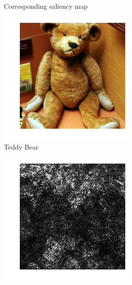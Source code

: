 \documentclass{article}
\begin{document}
\begin{figure}[hbt!]
\begin{subfigure}{.34\textwidth}
    		\caption*{Corresponding saliency map}
    		\label{energydetPSK}
    	\end{subfigure}	
    	\medskip
    	\hfil
    	\begin{subfigure}{.33\textwidth}
    		\includegraphics[width=\linewidth]{images/teddy_bear.png}
    		\caption{Teddy Bear}
    		\label{velcomp}
    	\end{subfigure}
    	\hfil
    	\begin{subfigure}{.33\textwidth}
    		\includegraphics[width=\linewidth]{images/teddy_bear_saliency.png}

\end{subfigure}
\end{figure}
\end{document}
